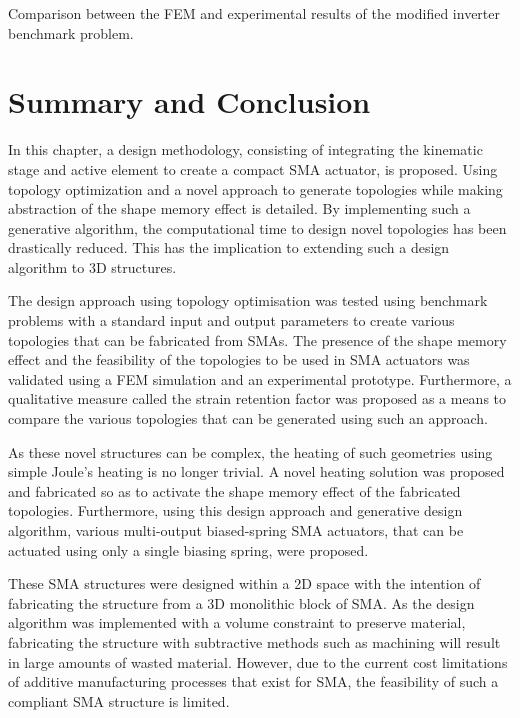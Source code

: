 \begin{table}[hbt!]
    \centering
    \caption{Comparison between the FEM and experimental results of the modified inverter benchmark problem.}
    \label{tab:simo-results}
    
\end{table}



\section{Summary and Conclusion}
In this chapter, a design methodology, consisting of integrating the kinematic stage and active element to create a compact SMA actuator, is proposed. Using topology optimization and a novel approach to generate topologies while making abstraction of the shape memory effect is detailed. By implementing such a generative algorithm, the computational time to design novel topologies has been drastically reduced. This has the implication to extending such a design algorithm to 3D structures.

The design approach using topology optimisation was tested using benchmark problems with a standard input and output parameters to create various topologies that can be fabricated from SMAs. The presence of the shape memory effect and the feasibility of the topologies to be used in SMA actuators was validated using a FEM simulation and an experimental prototype. Furthermore, a qualitative measure called the strain retention factor was proposed as a means to compare the various topologies that can be generated using such an approach.

As these novel structures can be complex, the heating of such geometries using simple Joule's heating is no longer trivial. A novel heating solution was proposed and fabricated so as to activate the shape memory effect of the fabricated topologies. Furthermore, using this design approach and generative design algorithm, various multi-output biased-spring SMA actuators, that can be actuated using only a single biasing spring, were proposed.

These SMA structures were designed within a 2D space with the intention of fabricating the structure from a 3D monolithic block of SMA. As the design algorithm was implemented with a volume constraint to preserve material, fabricating the structure with subtractive methods such as machining will result in large amounts of wasted material. However, due to the current cost limitations of additive manufacturing processes that exist for SMA, the feasibility of such a compliant SMA structure is limited.

